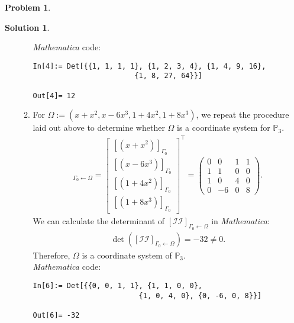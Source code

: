 \documentclass{book}
\theoremstyle{definition}
\newtheorem*{prob*}{Problem}
\newtheorem*{sln*}{Solution}
\begin{document}
\begin{prob*}
\begin{sln*}
\begin{enumerate}
\begin{enumerate}
				\textit{Mathematica} code:
		\begin{lstlisting}
In[4]:= Det[{{1, 1, 1, 1}, {1, 2, 3, 4}, {1, 4, 9, 16}, 
						{1, 8, 27, 64}}]
				
Out[4]= 12
		\end{lstlisting}
		
		
		
		
		
		
				\item For $\Omega := (x+x^2,x-6x^3,1+4x^2,1+8x^3)$, we repeat the procedure laid out above to determine whether $\Omega$ is a coordinate system for $\mathbb{P}_3$. 
				\begin{align*}
				[\mathcal{II}]_{\Gamma_0\leftarrow\Omega}
				= \begin{bmatrix}
				[(x+x^2)]_{\Gamma_0} \\ [(x-6x^3)]_{\Gamma_0} \\ [(1+4x^2)]_{\Gamma_0} \\ [(1+8x^3)]_{\Gamma_0}
				\end{bmatrix}^\top
				= \begin{pmatrix}
				0&0&1&1\\
				1&1&0&0\\
				1&0&4&0\\
				0&-6&0&8
				\end{pmatrix}. 
				\end{align*} 
				We can calculate the determinant of $[\mathcal{II}]_{\Gamma_0\leftarrow\Omega}$ in \textit{Mathematica}:
				\begin{align*}
				\det\left( [\mathcal{II}]_{\Gamma_0\leftarrow\Omega}  \right) = -32 \neq 0.
				\end{align*}
				Therefore, $\Omega$ is a coordinate system of $\mathbb{P}_3$.\\
				
				\textit{Mathematica} code:
				\begin{lstlisting}
In[6]:= Det[{{0, 0, 1, 1}, {1, 1, 0, 0},
						 {1, 0, 4, 0}, {0, -6, 0, 8}}]
				
Out[6]= -32
				\end{lstlisting}
				
			\end{enumerate}
		
		
		

\end{enumerate}
\end{sln*}
\end{prob*}
\end{document}
